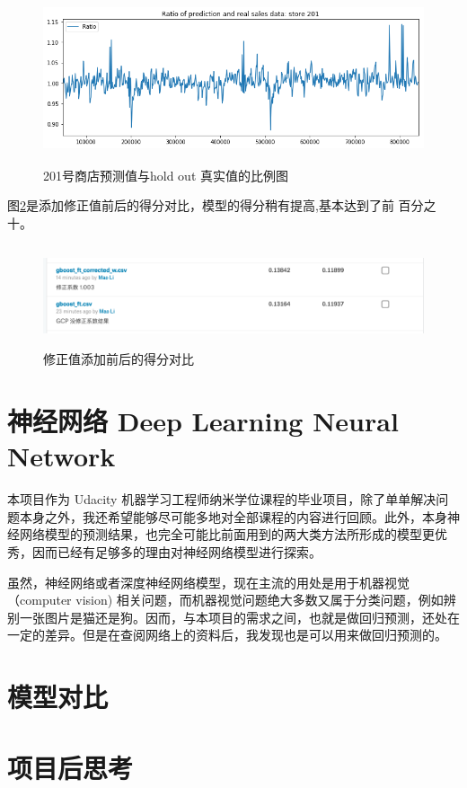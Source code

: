 \documentclass[a4paper]{article}
\begin{document}
\begin{figure}[ht]
 \centering
 \includegraphics[height=5cm,width=\textwidth]{images/ratio201}
 \caption{201号商店预测值与hold out 真实值的比例图}
 \label{fig:ratio201}
\end{figure}
图\ref{fig:correction-score}是添加修正值前后的得分对比，模型的得分稍有提高,基本达到了前 百分之十。
\begin{figure}[ht]
 \centering
 \includegraphics[height=3cm,width=\textwidth]{images/correction-score}
 \caption{修正值添加前后的得分对比}
 \label{fig:correction-score}
\end{figure}
\section{神经网络 Deep Learning Neural Network}\label{keras}
本项目作为 Udacity 机器学习工程师纳米学位课程的毕业项目，除了单单解决问题本身之外，我还希望能够尽可能多地对全部课程的内容进行回顾。此外，本身神经网络模型的预测结果，也完全可能比前面用到的两大类方法所形成的模型更优秀，因而已经有足够多的理由对神经网络模型进行探索。

虽然，神经网络或者深度神经网络模型，现在主流的用处是用于机器视觉（computer vision) 相关问题，而机器视觉问题绝大多数又属于分类问题，例如辨别一张图片是猫还是狗。因而，与本项目的需求之间，也就是做回归预测，还处在一定的差异。但是在查阅网络上的资料后，我发现也是可以用来做回归预测的。

\section{模型对比}

\section{项目后思考}
\end{document}

